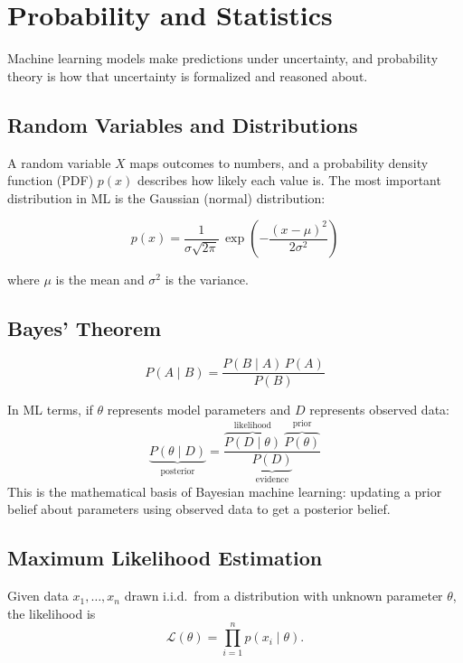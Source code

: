 \chapter{Probability and Statistics}

Machine learning models make predictions under uncertainty, and
probability theory is how that uncertainty is formalized and reasoned
about.

\section{Random Variables and Distributions}

A random variable $X$ maps outcomes to numbers, and a probability density
function (PDF) $p(x)$ describes how likely each value is. The most
important distribution in ML is the Gaussian (normal) distribution:

\[
  p(x) = \frac{1}{\sigma\sqrt{2\pi}}\, \exp\!\left(-\frac{(x-\mu)^2}{2\sigma^2}\right)
\]

where $\mu$ is the mean and $\sigma^2$ is the variance.


\section{Bayes' Theorem}

\begin{definition}
\[
  P(A\mid B) = \frac{P(B\mid A)\,P(A)}{P(B)}
\]
\end{definition}

In ML terms, if $\theta$ represents model parameters and $D$ represents
observed data:
\[
  \underbrace{P(\theta \mid D)}_{\text{posterior}} = \frac{\overbrace{P(D\mid\theta)}^{\text{likelihood}}\ \overbrace{P(\theta)}^{\text{prior}}}{\underbrace{P(D)}_{\text{evidence}}}
\]
This is the mathematical basis of Bayesian machine learning: updating a
prior belief about parameters using observed data to get a posterior
belief.

\section{Maximum Likelihood Estimation}

\begin{definition}[Likelihood]
Given data $x_1,\ldots,x_n$ drawn i.i.d.\ from a distribution with unknown
parameter $\theta$, the likelihood is
\[
  \mathcal{L}(\theta) = \prod_{i=1}^n p(x_i \mid \theta).
\]
\end{definition}

